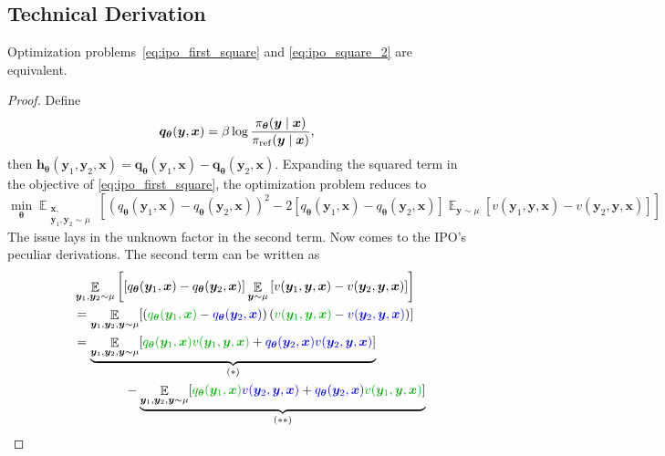 \documentclass[11pt,a4paper]{article}
\begin{document}
\subsection{Technical Derivation}%
\begin{lemma}
    Optimization problems~\eqref{eq:ipo_first_square} and \eqref{eq:ipo_square_2} are equivalent.
\end{lemma}
\begin{proof}
Define 
\[
\bm{q}_{\boldsymbol \theta}(\bm{y}, \bm{x}) = \beta \log \dfrac{\pi_{\boldsymbol \theta}(\bm{y} \mid \bm{x})}{\pi_{\rm ref }(\bm{y} \mid \bm{x})},
\]
then $\bm{h}_{\boldsymbol \theta}(\bm{y}_1, \bm{y}_2, \bm{x})= \bm{q}_{\boldsymbol \theta}(\bm{y}_1, \bm{x}) - \bm{q}_{\boldsymbol \theta}(\bm{y}_2, \bm{x})$.
Expanding the squared term in the objective of \eqref{eq:ipo_first_square}, the optimization problem reduces to
\begin{equation}
\label{eq:qioqli}
\min_{\boldsymbol \theta}  \mathop{\mathbb{E}}_{\substack{\bm{x},\\ \bm{y}_1, \bm{y}_2\sim \mu}} \left[ (q_{\boldsymbol \theta}(\bm{y}_1, \bm{x})- q_{\boldsymbol \theta}(\bm{y}_2, \bm{x}))^2 - 2 [q_{\boldsymbol \theta}(\bm{y}_1, \bm{x}) - q_{\boldsymbol \theta}(\bm{y}_2, \bm{x})]\mathop{\mathbb{E}}_{\bm{y} \sim \mu}\left[v(\bm{y}_1, \bm{y}, \bm{x}) - v(\bm{y}_2, \bm{y}, \bm{x}) \right]  \right]
\end{equation}
The issue lays in the unknown factor in the second term.
Now comes to the IPO's peculiar derivations. The second term can be written as
\begin{align*}
\quad \quad &\mathop{\mathbb{E}}_{\bm{y}_1, \bm{y}_2 \sim \mu} \left[ [q_{\boldsymbol \theta}(\bm{y}_1, \bm{x})- q_{\boldsymbol \theta}(\bm{y}_2, \bm{x})]  \mathop{\mathbb{E}}_{\bm{y} \sim \mu}\left[ v(\bm{y}_1, \bm{y}, \bm{x}) - v(\bm{y}_2, \bm{y}, \bm{x}) \right]  \right] \\
&= \mathop{\mathbb{E}}_{\bm{y}_1, \bm{y}_2, \bm{y} \sim \mu}[({\green q_{\boldsymbol \theta}(\bm{y}_1, \bm{x})} - {\blue q_{\boldsymbol \theta}(\bm{y}_2, \bm{x})}) \left({\green v(\bm{y}_1, \bm{y}, \bm{x})} - {\blue v(\bm{y}_2, \bm{y}, \bm{x})} \right)] \\
&= \underbrace{\mathop{\mathbb{E}}_{\bm{y}_1, \bm{y}_2, \bm{y} \sim \mu} [{\green q_{\boldsymbol \theta}({\green \bm{y}_1}, \bm{x}) v(\bm{y}_1, \bm{y}, \bm{x})} + {\blue q_{\boldsymbol \theta}(\bm{y}_2, \bm{x}) v(\bm{y}_2, \bm{y}, \bm{x})}]}_{(*)} \\
&\qquad \qquad - \underbrace{\mathop{\mathbb{E}}_{\bm{y}_1, \bm{y}_2, \bm{y} \sim \mu } [{\green q_{\boldsymbol \theta}(\bm{y}_1, \bm{x})} {\blue v(\bm{y}_2, \bm{y}, \bm{x})}+ {\blue q_{\boldsymbol \theta}(\bm{y}_2, \bm{x})} {\green v(\bm{y}_1, \bm{y}, \bm{x})}] }_{(**)}

\end{align*}
\end{proof}
\end{document}
